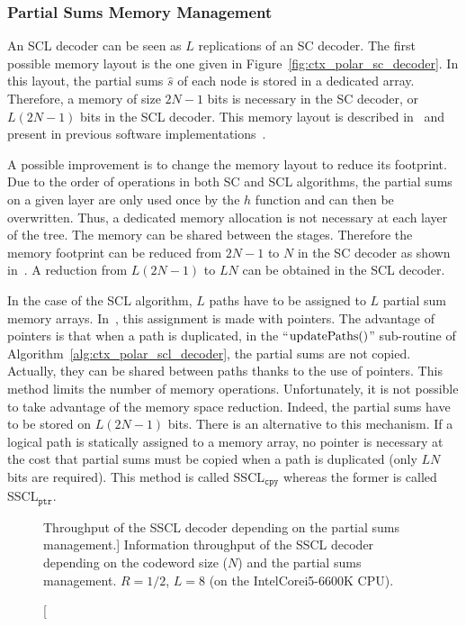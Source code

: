 \subsubsection{Partial Sums Memory Management}
\label{sec:opt_polar_scl_partial_sum}

An SCL decoder can be seen as $L$ replications of an SC decoder. The first
possible memory layout is the one given in
Figure~\ref{fig:ctx_polar_sc_decoder}. In this layout, the partial sums
$\hat{s}$ of each node is stored in a dedicated array. Therefore, a memory of
size $2N-1$ bits is necessary in the SC decoder, or $L(2N -1)$ bits in the SCL
decoder. This memory layout is described in~\cite{Tal2011} and present in
previous software implementations~\cite{Sarkis2014b,Sarkis2016,Shen2016}.

A possible improvement is to change the memory layout to reduce its footprint.
Due to the order of operations in both SC and SCL algorithms, the partial sums
on a given layer are only used once by the $h$ function and can then be
overwritten. Thus, a dedicated memory allocation is not necessary at each layer
of the tree. The memory can be shared between the stages. Therefore the memory
footprint can be reduced from $2N-1$ to $N$ in the SC decoder as shown
in~\cite{Leroux2013}. A reduction from $L(2N -1)$ to $LN$ can be obtained in the
SCL decoder.

In the case of the SCL algorithm, $L$ paths have to be assigned to $L$ partial
sum memory arrays. In~\cite{Tal2011}, this assignment is made with pointers. The
advantage of pointers is that when a path is duplicated, in the
``$\operatorname*{updatePaths}()$'' sub-routine of Algorithm~\ref{alg:ctx_polar_scl_decoder},
the partial sums are not copied. Actually, they can be shared between paths
thanks to the use of pointers. This method limits the number of memory
operations. Unfortunately, it is not possible to take advantage of the memory
space reduction. Indeed, the partial sums have to be stored on $L(2N -1)$ bits.
There is an alternative to this mechanism. If a logical path is statically
assigned to a memory array, no pointer is necessary at the cost that partial
sums must be copied when a path is duplicated (only $LN$ bits are required).
This method is called SSCL$_{\texttt{cpy}}$ whereas the former is called
SSCL$_{\texttt{ptr}}$.

\begin{figure}[htp]
  \centering
  \caption
    [Throughput of the SSCL decoder depending on the partial sums management.]
    {Information throughput of the SSCL decoder depending on the codeword
    size ($N$) and the partial sums management. $R = 1 / 2$, $L = 8$ (on the
    Intel\R Core\TM i5-6600K CPU).}
  \label{plot:opt_polar_scl_cpy_vs_ptr}
\end{figure}

